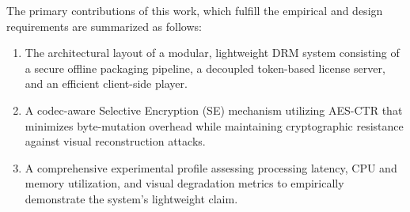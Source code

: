 The primary contributions of this work, which fulfill the empirical and design requirements are summarized as follows:
\begin{enumerate}
    \item The architectural layout of a modular, lightweight DRM system consisting of a secure offline packaging pipeline, a decoupled token-based license server, and an efficient client-side player.
    \item A codec-aware Selective Encryption (SE) mechanism utilizing AES-CTR that minimizes byte-mutation overhead while maintaining cryptographic resistance against visual reconstruction attacks.
    \item A comprehensive experimental profile assessing processing latency, CPU and memory utilization, and visual degradation metrics to empirically demonstrate the system's lightweight claim.
\end{enumerate}